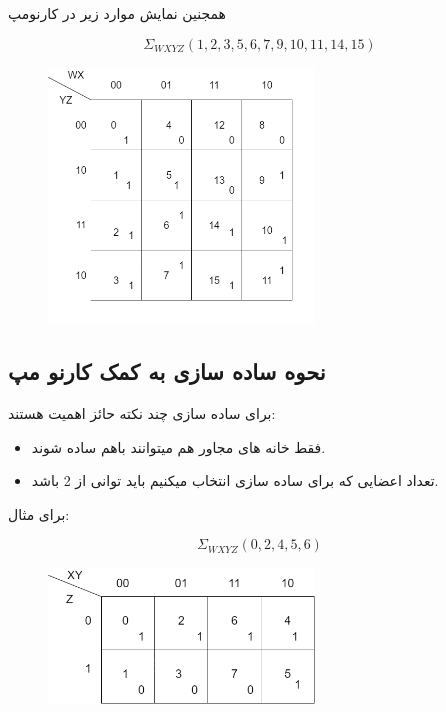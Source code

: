 \documentclass[20pt, a4paper]{article}
\begin{document}
همجنین نمایش موارد زیر در کارنومپ

\begin{equation}
	\Sigma_{WXYZ}(1, 2, 3, 5, 6, 7, 9, 10, 11, 14, 15)
\end{equation}

\begin{figure}[htbp]\centering
	\centerline{\includegraphics[width=200pt]{img/karnoughMap/k3.png}}
\end{figure}

\newpage


\subsection{نحوه ساده سازی به کمک کارنو مپ}
برای ساده سازی چند نکته حائز اهمیت هستند:
\begin{itemize}
	\item فقط خانه های مجاور هم میتوانند باهم ساده شوند.
	\item تعداد اعضایی که برای ساده سازی انتخاب میکنیم باید توانی از 2 باشد.
\end{itemize}

برای مثال:

\begin{equation}
	\Sigma_{WXYZ}(0, 2, 4, 5, 6)
\end{equation}

\begin{figure}[htbp]\centering
	\centerline{\includegraphics[width=200pt]{img/karnoughMap/k4.png}}
\end{figure}
\end{document}
